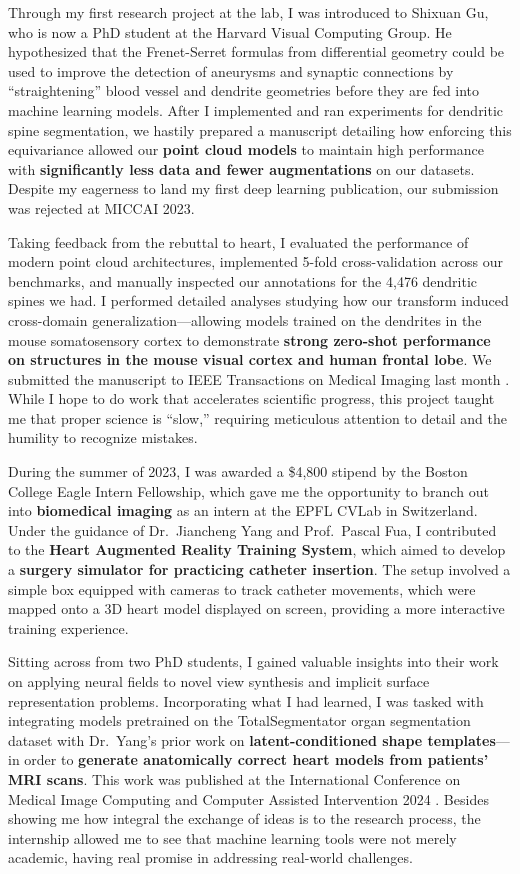 \documentclass[letterpaper,11pt]{article}
\begin{document}
Through my first research project at the lab, I was introduced to Shixuan Gu, who is now a PhD student at the Harvard Visual Computing Group. He hypothesized that the Frenet-Serret formulas from differential geometry could be used to improve the detection of aneurysms and synaptic connections by “straightening” blood vessel and dendrite geometries before they are fed into machine learning models. After I implemented and ran experiments for dendritic spine segmentation, we hastily prepared a manuscript detailing how enforcing this equivariance allowed our \textbf{point cloud models} to maintain high performance with \textbf{significantly less data and fewer augmentations} on our datasets. Despite my eagerness to land my first deep learning publication, our submission was rejected at MICCAI 2023.

Taking feedback from the rebuttal to heart, I evaluated the performance of modern point cloud architectures, implemented 5-fold cross-validation across our benchmarks, and manually inspected our annotations for the 4,476 dendritic spines we had. I performed detailed analyses studying how our transform induced cross-domain generalization---allowing models trained on the dendrites in the mouse somatosensory cortex to demonstrate \textbf{strong zero-shot performance on structures in the mouse visual cortex and human frontal lobe}. We submitted the manuscript to IEEE Transactions on Medical Imaging last month . While I hope to do work that accelerates scientific progress, this project taught me that proper science is “slow,” requiring meticulous attention to detail and the humility to recognize mistakes.

During the summer of 2023, I was awarded a \$4,800 stipend by the Boston College Eagle Intern Fellowship, which gave me the opportunity to branch out into \textbf{biomedical imaging} as an intern at the EPFL CVLab in Switzerland. Under the guidance of Dr.\ Jiancheng Yang and Prof.\ Pascal Fua, I contributed to the \textbf{Heart Augmented Reality Training System}, which aimed to develop a \textbf{surgery simulator for practicing catheter insertion}. The setup involved a simple box equipped with cameras to track catheter movements, which were mapped onto a 3D heart model displayed on screen, providing a more interactive training experience.

Sitting across from two PhD students, I gained valuable insights into their work on applying neural fields to novel view synthesis and implicit surface representation problems. Incorporating what I had learned, I was tasked with integrating models pretrained on the TotalSegmentator organ segmentation dataset with Dr.\ Yang’s prior work on \textbf{latent-conditioned shape templates}---in order to \textbf{generate anatomically correct heart models from patients’ MRI scans}. This work was published at the International Conference on Medical Image Computing and Computer Assisted Intervention 2024 . Besides showing me how integral the exchange of ideas is to the research process, the internship allowed me to see that machine learning tools were not merely academic, having real promise in addressing real-world challenges.
\end{document}
